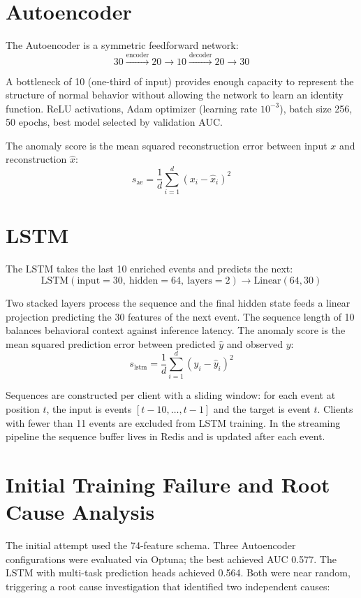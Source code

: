 \section{Autoencoder}

The Autoencoder is a symmetric feedforward network:
\[
30 \xrightarrow{\text{encoder}} 20 \longrightarrow 10 \xrightarrow{\text{decoder}} 20 \longrightarrow 30
\]

A bottleneck of 10 (one-third of input) provides enough capacity to represent the structure of normal behavior without allowing the network to learn an identity function. ReLU activations, Adam optimizer (learning rate $10^{-3}$), batch size 256, 50 epochs, best model selected by validation AUC.

The anomaly score is the mean squared reconstruction error between input $x$ and reconstruction $\hat{x}$:
\[
s_{\text{ae}} = \frac{1}{d}\sum_{i=1}^{d}(x_i - \hat{x}_i)^2
\]

\section{LSTM}

The LSTM takes the last 10 enriched events and predicts the next:
\[
\text{LSTM}(\text{input} = 30,\ \text{hidden} = 64,\ \text{layers} = 2) \rightarrow \text{Linear}(64, 30)
\]

Two stacked layers process the sequence and the final hidden state feeds a linear projection predicting the 30 features of the next event. The sequence length of 10 balances behavioral context against inference latency. The anomaly score is the mean squared prediction error between predicted $\hat{y}$ and observed $y$:
\[
s_{\text{lstm}} = \frac{1}{d}\sum_{i=1}^{d}(y_i - \hat{y}_i)^2
\]

Sequences are constructed per client with a sliding window: for each event at position $t$, the input is events $[t-10, \dots, t-1]$ and the target is event $t$. Clients with fewer than 11 events are excluded from LSTM training. In the streaming pipeline the sequence buffer lives in Redis and is updated after each event.

\section{Initial Training Failure and Root Cause Analysis}

The initial attempt used the 74-feature schema. Three Autoencoder configurations were evaluated via Optuna; the best achieved AUC 0.577. The LSTM with multi-task prediction heads achieved 0.564. Both were near random, triggering a root cause investigation that identified two independent causes:


